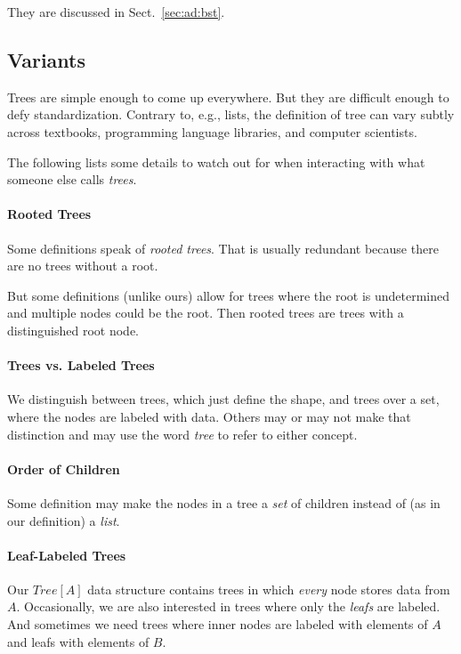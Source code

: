 They are discussed in Sect.~\ref{sec:ad:bst}.

\subsection{Variants}

Trees are simple enough to come up everywhere.
But they are difficult enough to defy standardization.
Contrary to, e.g., lists, the definition of tree can vary subtly across textbooks, programming language libraries, and computer scientists.

The following lists some details to watch out for when interacting with what someone else calls \emph{trees}.

\paragraph{Rooted Trees}
Some definitions speak of \emph{rooted trees}.
That is usually redundant because there are no trees without a root.

But some definitions (unlike ours) allow for trees where the root is undetermined and multiple nodes could be the root.
Then rooted trees are trees with a distinguished root node.

\paragraph{Trees vs. Labeled Trees}
We distinguish between trees, which just define the shape, and trees over a set, where the nodes are labeled with data.
Others may or may not make that distinction and may use the word \emph{tree} to refer to either concept.

\paragraph{Order of Children}
Some definition may make the nodes in a tree a \emph{set} of children instead of (as in our definition) a \emph{list}.

\paragraph{Leaf-Labeled Trees}
Our $Tree[A]$ data structure contains trees in which \emph{every} node stores data from $A$.
Occasionally, we are also interested in trees where only the \emph{leafs} are labeled.
And sometimes we need trees where inner nodes are labeled with elements of $A$ and leafs with elements of $B$.

